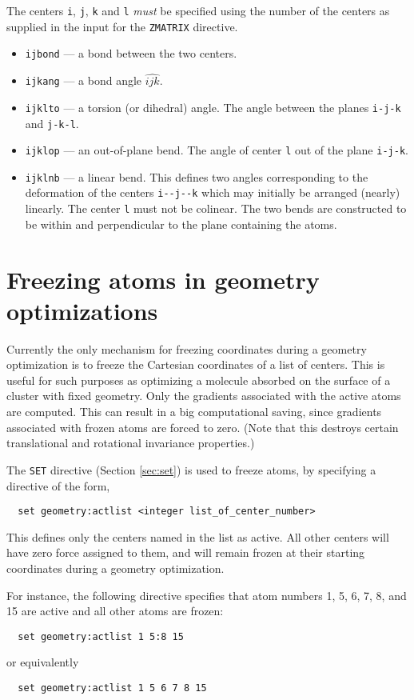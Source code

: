 The centers \verb+i+, \verb+j+, \verb+k+ and \verb+l+ {\em must}
be specified using the number of the centers as supplied in the input
for the \verb+ZMATRIX+ directive.  

\begin{itemize}
\item {\tt ijbond} --- a bond between the two centers.
\item {\tt ijkang} --- a bond angle $\widehat{ijk}$.
\item {\tt ijklto} --- a torsion (or dihedral) angle.  The
  angle between the planes \verb+i-j-k+ and \verb+j-k-l+.
\item {\tt ijklop} --- an out-of-plane bend.  The angle of center
  \verb+l+ out of the plane \verb+i-j-k+.
\item {\tt ijklnb} --- a linear bend.  This defines two angles
  corresponding to the deformation of the centers \verb+i--j--k+ 
  which may initially be arranged (nearly) linearly.  The center
  \verb+l+ must not be colinear.  The two bends are constructed to be
  within and perpendicular to the plane containing the atoms.
\end{itemize}   

\section{Freezing atoms in geometry optimizations}
\label{sec:activeatoms}

Currently the only mechanism for freezing coordinates during a
geometry optimization is to freeze the Cartesian coordinates of a list
of centers.  This is useful for such purposes as optimizing a molecule
absorbed on the surface of a cluster with fixed geometry.  Only the
gradients associated with the active atoms are computed.  This can
result in a big computational saving, since gradients associated with
frozen atoms are forced to zero.  (Note that this destroys certain
translational and rotational invariance properties.)

The \verb+SET+ directive (Section \ref{sec:set}) is used to freeze
atoms, by specifying a directive of the form,
\begin{verbatim}
  set geometry:actlist <integer list_of_center_number>
\end{verbatim}
This defines only the centers named in the list as active.  All
other 
centers will have zero force assigned to them, and will remain frozen
at their starting coordinates during a geometry optimization.

For instance, the following directive specifies that atom numbers 1,
5, 6, 7, 8, and 15 are active and all other atoms are frozen:
\begin{verbatim}
  set geometry:actlist 1 5:8 15
\end{verbatim}
or equivalently
\begin{verbatim}
  set geometry:actlist 1 5 6 7 8 15
\end{verbatim}


